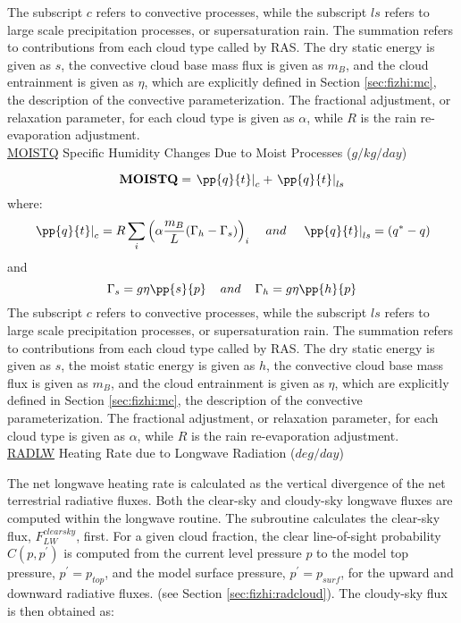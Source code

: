 \noindent
The subscript $c$ refers to convective processes, while the subscript $ls$ refers to large scale
precipitation processes, or supersaturation rain. 
The summation refers to contributions from each cloud type called by RAS.  
The dry static energy is given 
as $s$, the convective cloud base mass flux is given as $m_B$, and the cloud entrainment is
given as $\eta$, which are explicitly defined in Section \ref{sec:fizhi:mc}, 
the description of the convective parameterization.  The fractional adjustment, or relaxation
parameter, for each cloud type is given as $\alpha$, while
$R$ is the rain re-evaporation adjustment.
\\

\noindent
{ \underline {MOISTQ} Specific Humidity Changes Due to Moist Processes ($g/kg/day$) } 

\noindent
\[
{\bf MOISTQ} = \left. {\pp{q}{t}}\right|_{c} + \left. {\pp{q}{t}} \right|_{ls}
\]
where:
\[
\left.{\pp{q}{t}}\right|_{c} = R \sum_i \left( \alpha { m_B \over {L}}(\Gamma_h-\Gamma_s) \right)_i 
\hspace{.4cm} and 
\hspace{.4cm} \left.{\pp{q}{t}}\right|_{ls} = (q^*-q)
\]
and
\[
\Gamma_s = g \eta \pp{s}{p}\hspace{.4cm} and \hspace{.4cm}\Gamma_h = g \eta \pp{h}{p}
\]
\noindent
The subscript $c$ refers to convective processes, while the subscript $ls$ refers to large scale
precipitation processes, or supersaturation rain. 
The summation refers to contributions from each cloud type called by RAS.  
The dry static energy is given as $s$, 
the moist static energy is given as $h$, 
the convective cloud base mass flux is given as $m_B$, and the cloud entrainment is
given as $\eta$, which are explicitly defined in Section \ref{sec:fizhi:mc}, 
the description of the convective parameterization.  The fractional adjustment, or relaxation
parameter, for each cloud type is given as $\alpha$, while
$R$ is the rain re-evaporation adjustment.
\\

\noindent
{ \underline {RADLW} Heating Rate due to Longwave Radiation ($deg/day$) }

\noindent
The net longwave heating rate is calculated as the vertical divergence of the
net terrestrial radiative fluxes.
Both the clear-sky and cloudy-sky longwave fluxes are computed within the
longwave routine.
The subroutine calculates the clear-sky flux, $F^{clearsky}_{LW}$, first.
For a given cloud fraction,
the clear line-of-sight probability $C(p,p^{\prime})$ is computed from the current level pressure $p$ 
to the model top pressure, $p^{\prime} = p_{top}$, and the model surface pressure, $p^{\prime} = p_{surf}$,
for the upward and downward radiative fluxes.
(see Section \ref{sec:fizhi:radcloud}).
The cloudy-sky flux is then obtained as:
   

